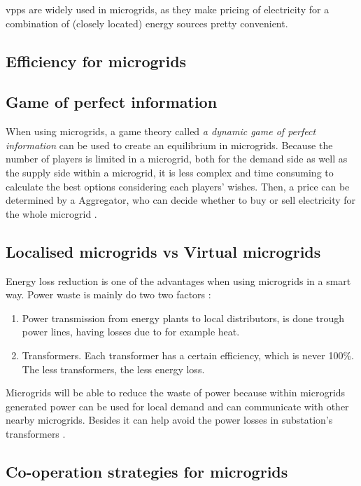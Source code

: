 \glspl{vpp} are widely used in microgrids, as they make pricing of electricity for a combination of (closely located) energy sources pretty convenient. 

\subsection{Efficiency for microgrids}

\subsection{Game of perfect information}
When using microgrids, a game theory called \emph{a dynamic game of perfect information}  can be used to create an equilibrium in microgrids. Because the number of players is limited in a microgrid, both for the demand side as well as the supply side within a microgrid, it is less complex and time consuming to calculate the best options considering each players' wishes. Then, a price can be determined by a Aggregator, who can decide whether to buy or sell electricity for the whole microgrid \cite{MicrogridModellingPetrosAristidou}.

\subsection{Localised microgrids vs Virtual microgrids}
Energy loss reduction is one of the advantages when using microgrids in a smart way. Power waste is mainly do two two factors \cite{EnergyLossURL}: 

\begin{enumerate}
\item Power transmission from energy plants to local distributors, is done trough power lines, having losses due to for example heat.
\item Transformers. Each transformer has a certain efficiency, which is never 100\%. The less transformers, the less energy loss.
\end{enumerate}

Microgrids will be able to reduce the waste of power because within microgrids generated power can be used for local demand and can communicate with other nearby microgrids. Besides it can help avoid the power losses in substation's transformers \cite{keypaper}.

\subsection{Co-operation strategies for microgrids}




